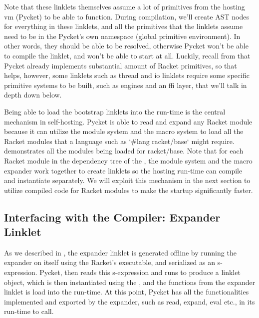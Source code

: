 		\begin{paragraph-here}%
			Note that these linklets themselves assume a lot of primitives from the hosting \gls{vm} (Pycket) to be able to function. During compilation, we'll create AST nodes for everything in these linklets, and all the primitives that the linklets assume need to be in the Pycket's own namespace (global primitive environment). In other words, they should be able to be resolved, otherwise Pycket won't be able to compile the linklet, and won't be able to start at all. Luckily, recall from  that Pycket already implements substantial amount of Racket primitives, so that helps, however, some linklets such as thread and io linklets require some specific primitive systems to be built, such as engines and an ffi layer, that we'll talk in depth down below.
		\end{paragraph-here}

		\inputFigure{pycket}{figure-racket-base-loading-no-compiled}

		\begin{paragraph-here}%
			Being able to load the bootstrap linklets into the run-time is the central mechanism in self-hosting. Pycket is able to read and expand any Racket module because it can utilize the module system and the macro system to load all the Racket modules that a language such as `\#lang racket/base` might require.  demonstrates all the modules being loaded for racket/base. Note that for each Racket module in the dependency tree of the , the module system and the macro expander work together to create linklets so the hosting run-time can compile and instantiate separately. We will exploit this mechanism in the next section to utilize compiled code for Racket modules to make the startup significantly faster.
		\end{paragraph-here}

		\subsection{Interfacing with the Compiler: Expander Linklet}



			\begin{paragraph-here}%
				As we described in , the expander linklet
				is generated offline by running the expander on itself using the
				Racket's executable, and serialized as an s-expression. Pycket, then
				reads this s-expression and runs  to produce a
				linklet object, which is then instantiated using the
				, and the functions from the expander
				linklet is load into the run-time. At this point, Pycket has all the
				functionalities implemented and exported by the expander, such as
				read, expand, eval etc., in its run-time to call.
			\end{paragraph-here}

